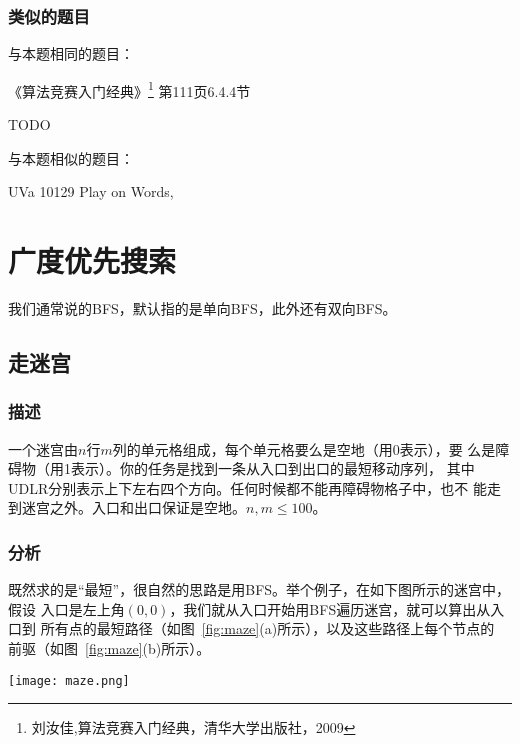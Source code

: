 \subsubsection{类似的题目}
与本题相同的题目：
\begindot
\item 《算法竞赛入门经典》\footnote{刘汝佳,算法竞赛入门经典，清华大学出版社，2009} 第111页6.4.4节
\item  TODO
\myenddot

与本题相似的题目：
\begindot
\item  UVa 10129 Play on Words, 
\myenddot

\section{广度优先搜索} %

我们通常说的BFS，默认指的是单向BFS，此外还有双向BFS。

\subsection{走迷宫}

\subsubsection{描述}
一个迷宫由$n$行$m$列的单元格组成，每个单元格要么是空地（用0表示），要
么是障碍物（用1表示）。你的任务是找到一条从入口到出口的最短移动序列，
其中UDLR分别表示上下左右四个方向。任何时候都不能再障碍物格子中，也不
能走到迷宫之外。入口和出口保证是空地。$n,m \leq 100$。

\subsubsection{分析}
既然求的是“最短”，很自然的思路是用BFS。举个例子，在如下图所示的迷宫中，假设
入口是左上角$(0,0)$，我们就从入口开始用BFS遍历迷宫，就可以算出从入口到
所有点的最短路径（如图~\ref{fig:maze}(a)所示），以及这些路径上每个节点的
前驱（如图~\ref{fig:maze}(b)所示）。

\begin{center}
\texttt{[image: maze.png]}\\
\label{fig:maze}
\end{center}

